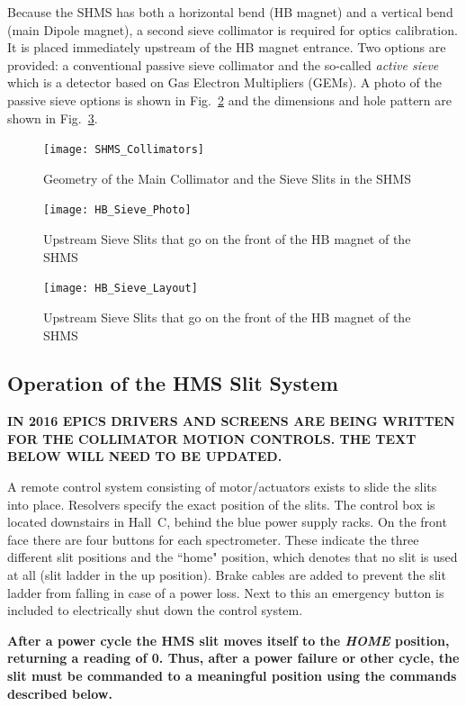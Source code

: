 {Because the SHMS has both a horizontal bend (HB magnet) and a vertical bend (main Dipole
magnet), a second sieve collimator is required for optics calibration. It is placed immediately
upstream of the HB magnet entrance. Two options are provided: a conventional passive
sieve collimator and the so-called \textit{active sieve} which is a detector based on Gas Electron 
Multipliers (GEMs).  A photo of the passive sieve options is shown in Fig.~\ref{fig:HB_Sieve_Photo}
and the dimensions and hole pattern are shown in Fig.~\ref{fig:HB_Sieve_Layout}.

\begin{figure}
\texttt{[image: SHMS\_Collimators]}
\caption{Geometry of the Main Collimator and the Sieve Slits in the SHMS \label{fig:SHMS_Collimators}}
\end{figure}

\begin{figure}
\texttt{[image: HB\_Sieve\_Photo]}
\caption{Upstream Sieve Slits that go on the front of the HB magnet of the SHMS \label{fig:HB_Sieve_Photo}}
\end{figure}

\begin{figure}
\texttt{[image: HB\_Sieve\_Layout]}
\caption{Upstream Sieve Slits that go on the front of the HB magnet of the SHMS \label{fig:HB_Sieve_Layout}}
\end{figure}

\subsection{Operation of the HMS Slit System}\label{sssec:slit_control}

{\bf IN 2016 EPICS DRIVERS AND SCREENS ARE BEING WRITTEN FOR 
THE COLLIMATOR MOTION CONTROLS. THE TEXT BELOW WILL NEED TO BE UPDATED.}

A remote control system consisting of motor/actuators exists to slide
the slits into place. Resolvers specify the exact position of the
slits.  The control box is located downstairs in Hall~C, behind the
blue power supply racks. On the front face there are four buttons for
each spectrometer. These indicate the three different slit positions
and the ``home" position, which denotes that no slit is used at all
(slit ladder in the up position).  Brake cables are added to prevent
the slit ladder from falling in case of a power loss. Next to this an
emergency button is included to electrically shut down the control
system.

{\bf After a power cycle the HMS slit moves itself to the {\it HOME} position,
returning a reading of 0. Thus, after a power failure or other cycle, the slit
must be commanded to a meaningful position using the commands described below.}


}
